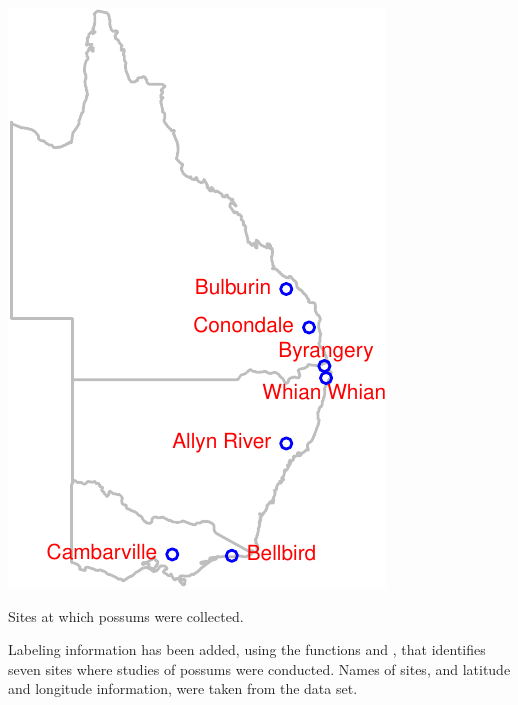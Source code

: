 \begin{marginfigure}
\begin{Schunk}


\centerline{\includegraphics[width=\textwidth]{figs/10-oz-sites-1} }

\end{Schunk}
\vspace*{3pt}

\caption{Sites at which possums were collected.\label{fig:possumsites}}
\end{marginfigure}

Labeling information has been added, using the functions
 and , that identifies seven sites where
studies of possums were conducted.  Names of sites, and latitude and
longitude information, were taken from the  data
set.

